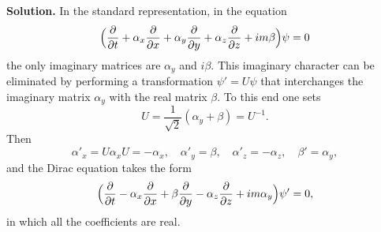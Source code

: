\begin{enumerate}
\textbf{Solution.} In the standard representation, in the equation
\[
\Bigl(\frac{\partial}{\partial t} + \alpha_x\frac{\partial}{\partial x} + \alpha_y\frac{\partial}{\partial y} + \alpha_z\frac{\partial}{\partial z} + im\beta\Bigr)\psi = 0
\]
the only imaginary matrices are $\alpha_y$ and $i\beta$. This imaginary character can be eliminated by performing a transformation $\psi' = U\psi$ that interchanges the imaginary matrix $\alpha_y$ with the real matrix $\beta$. To this end one sets
\[
U = \frac{1}{\sqrt2}(\alpha_y + \beta) = U^{-1}.
\]
Then
\[
\alpha'_x = U\alpha_x U = -\alpha_x,\quad \alpha'_y = \beta,\quad \alpha'_z = -\alpha_z,\quad \beta' = \alpha_y,
\]
and the Dirac equation takes the form
\[
\Bigl(\frac{\partial}{\partial t} - \alpha_x\frac{\partial}{\partial x} + \beta\frac{\partial}{\partial y} - \alpha_z\frac{\partial}{\partial z} + im\alpha_y\Bigr)\psi' = 0,
\]
in which all the coefficients are real.
\end{enumerate}
